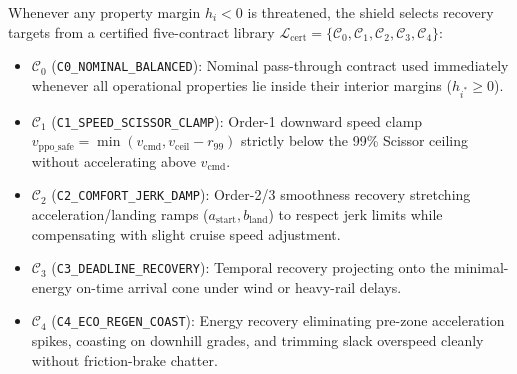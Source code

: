 \documentclass[10pt,a4paper]{article}
\begin{document}
Whenever any property margin $h_i < 0$ is threatened, the shield selects recovery targets from a certified five-contract library $\mathcal{L}_{\text{cert}} = \{\mathcal{C}_0, \mathcal{C}_1, \mathcal{C}_2, \mathcal{C}_3, \mathcal{C}_4\}$:
\begin{itemize}
    \item $\mathcal{C}_0$ (\texttt{C0\_NOMINAL\_BALANCED}): Nominal pass-through contract used immediately whenever all operational properties lie inside their interior margins ($h_{i^*} \ge 0$).
    \item $\mathcal{C}_1$ (\texttt{C1\_SPEED\_SCISSOR\_CLAMP}): Order-1 downward speed clamp $v_{\text{ppo\_safe}} = \min(v_{\text{cmd}}, v_{\text{ceil}} - r_{99})$ strictly below the 99\% Scissor ceiling without accelerating above $v_{\text{cmd}}$.
    \item $\mathcal{C}_2$ (\texttt{C2\_COMFORT\_JERK\_DAMP}): Order-2/3 smoothness recovery stretching acceleration/landing ramps ($a_{\text{start}}, b_{\text{land}}$) to respect jerk limits while compensating with slight cruise speed adjustment.
    \item $\mathcal{C}_3$ (\texttt{C3\_DEADLINE\_RECOVERY}): Temporal recovery projecting onto the minimal-energy on-time arrival cone under wind or heavy-rail delays.
    \item $\mathcal{C}_4$ (\texttt{C4\_ECO\_REGEN\_COAST}): Energy recovery eliminating pre-zone acceleration spikes, coasting on downhill grades, and trimming slack overspeed cleanly without friction-brake chatter.
\end{itemize}
\end{document}
